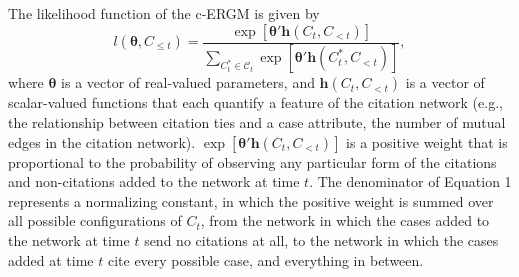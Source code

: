 \documentclass[headsepline=true, abstracton]{scrartcl}
\begin{document}
The likelihood function of the c-ERGM is given by
\begin{equation}
l(\bm{\theta},C_{\leq t}) =  \frac{ \exp \left[ {\bm{\theta}'\bm{h}(C_{t},C_{<t}) } \right] }{ \sum_{C_t^* \in \mathcal{C}_t} \exp \left[ {\bm{\theta}'\bm{h}(C^*_{t},C_{<t}) }\right]  },
\end{equation}
where $\bm{\theta}$ is a vector of real-valued parameters, and $\bm{h}(C_{t},C_{<t})$ is a vector of scalar-valued functions that each quantify a feature of the citation network (e.g., the relationship between citation ties and a case attribute, the number of mutual edges in the citation network). $\exp \left[ {\bm{\theta}'\bm{h}(C_{t},C_{<t}) } \right]$ is a positive weight that is proportional to the probability of observing any particular form of the citations and non-citations added to the network at time $t$.  The denominator of Equation 1 represents a normalizing constant, in which the positive weight is summed over all possible configurations of $C_{t}$, from the network in which the cases added to the network at time $t$ send no citations at all, to the network in which the cases added at time $t$ cite every possible case, and everything in between. %
\end{document}
